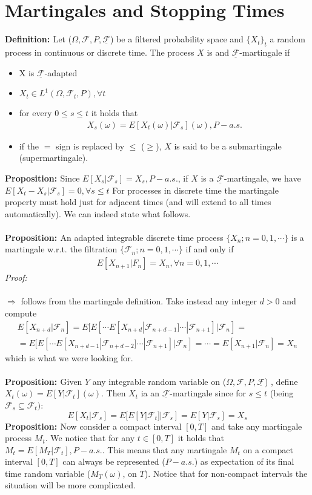 \documentclass[a4paper,10pt]{report}
\theoremstyle{plain}
\theoremstyle{definition}
\newcommand\be{\begin{eqnarray}}    %
\newcommand\ee{\end{eqnarray}}
\newcommand{\DEF} {{\bf{Definition: }}}
\newcommand{\PROP} {{\bf{Proposition: }}}
\newcommand{\PROOF} {{\emph{Proof: \\ \\}}}
\newcommand{\FF} {\mathcal{F} }
\newcommand{\FLT} {\underline{\mathcal{F}}}
\begin{document}
\section{Martingales and Stopping Times}
\DEF Let ($\Omega, \FF, P, \FLT$) be a filtered probability space and $\{X_t\}_t$ a random process in continuous or discrete time. The process $X$ is and $\FLT$-martingale if
\begin{itemize}
\item X is $\FLT$-adapted
\item $X_t\in L^1(\Omega,\FF_t,P), \forall t$
\item for every $0\leq s \leq t$ it holds that
\be
X_s(\omega)=E[X_t(\omega)|\FF_s](\omega), P-a.s. 
\ee
\item if the $=$ sign is replaced by $\leq$ ($\ge$), $X$ is said to be a submartingale (supermartingale).
\end{itemize}
\PROP Since $E[X_s|\FF_s]=X_s, P-a.s.$, if $X$ is a $\FLT$-martingale, we have $E[X_t-X_s|\FF_s]=0,\forall s\leq t$
For processes in discrete time the martingale property must hold just for adjacent times (and will extend to all times automatically). We can indeed state what follows.\\ \\
\PROP An adapted integrable discrete time process $\{X_n;n=0,1,\cdots\}$ is a martingale w.r.t. the filtration $\{\FF_n;n=0,1,\cdots\}$ if and only if
\be
E[X_{n+1}|F_n]=X_n,\forall n=0,1,\cdots
\label{martingalen}
\ee
\PROOF
$\Rightarrow$ follows from the martingale definition. Take instead any integer $d>0$ and compute
\be
E[X_{n+d}|\FF_n]=E[E[\cdots E[X_{n+d}|\FF_{n+d-1}]\cdots |\FF_{n+1}]|\FF_n]=\\
=E[E[\cdots E[X_{n+d-1}|\FF_{n+d-2}]\cdots |\FF_{n+1}]|\FF_n]=\cdots=E[X_{n+1}|\FF_n]=X_n
\ee
which is what we were looking for.\\ \\
\PROP Given $Y$ any integrable random variable on ($\Omega, \FF, P, \FLT$) , define $X_t(\omega)=E[Y|\FF_t](\omega)$. Then $X_t$ ia an $\FLT$-martingale since for $s\leq t$ (being $\FF_s\subseteq \FF_t)$:
\[
E[X_t|\FF_s]=E[E[Y|\FF_t]|\FF_s]=E[Y|\FF_s]=X_s
\]
\PROP Now consider a compact interval $[0,T]$ and take any martingale process $M_t$. We notice that for any $t\in [0,T]$ it holds that $M_t=E[M_T|\FF_t], P-a.s.$. This means that any martingale $M_t$ on a compact interval $[0,T]$ can always be represented ($P-a.s.$) as expectation of its final time random variable ($M_T(\omega)$, on $T$). Notice that for non-compact intervals the situation will be more complicated.\\ \\
\end{document}
